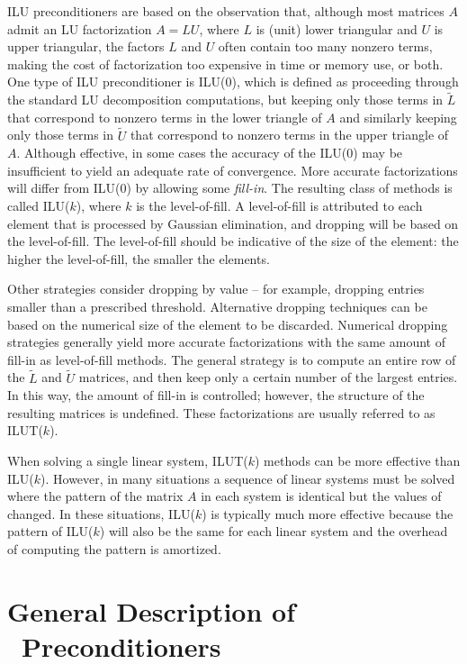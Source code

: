 ILU preconditioners are based on the observation
that, although most matrices $A$ admit an LU factorization $A=LU$, where $L$ is
(unit) lower triangular and $U$ is upper triangular, the factors $L$ and $U$ often
contain too many nonzero terms, making the cost of factorization too expensive in
time or memory use, or both.  One type of ILU preconditioner is ILU(0), which 
is defined as proceeding through the standard LU decomposition computations, but keeping 
only those terms in $\tilde{L}$ that correspond to nonzero terms in the lower
triangle of $A$ and similarly keeping only those terms in $\tilde{U}$ that 
correspond to nonzero terms in the upper triangle of $A$.  Although effective, in
some cases the accuracy of the ILU(0) may be insufficient to yield an
adequate rate of convergence. More accurate factorizations will differ
from ILU(0) by allowing some {\em fill-in}. The resulting class of
methods is called ILU($k$), where $k$ is the level-of-fill. A
level-of-fill is attributed to each element that is processed by
Gaussian elimination, and dropping will be based on the level-of-fill.
The level-of-fill should be indicative of the size of the element: the
higher the level-of-fill, the smaller the elements.  

Other strategies consider dropping by value -- for example, dropping
entries smaller than a prescribed threshold. Alternative dropping
techniques can be based on the numerical size of the element to be
discarded. Numerical dropping strategies generally yield more accurate
factorizations with the same amount of fill-in as level-of-fill
methods. The general strategy is to compute an entire row of the
$\tilde{L}$ and $\tilde{U}$ matrices, and then keep only a certain
number of the largest
entries. In this way, the amount of fill-in is
controlled; however, the structure of the resulting matrices is
undefined. These factorizations are usually referred to as ILUT($k$).

When solving a single linear system, ILUT($k$) methods can be more effective
than ILU($k$).  However, in many situations a sequence of linear systems
must be solved where the pattern of the matrix $A$ in each system is
identical but the values of changed.  In these situations, ILU($k$) is 
typically much more effective because the pattern of ILU($k$) will also
be the same for each linear system and the overhead of computing the
pattern is amortized.

\section{General Description of \ifpack\ Preconditioners}
\label{sec:prec}

